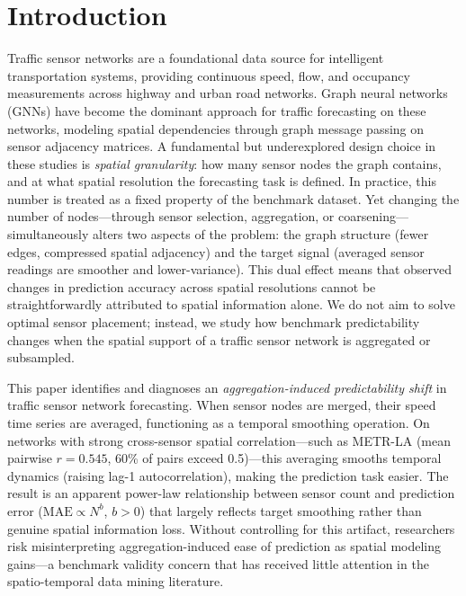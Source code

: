 \documentclass[sigconf]{acmart}
\begin{document}
\section{Introduction}

Traffic sensor networks are a foundational data source for intelligent transportation systems, providing continuous speed, flow, and occupancy measurements across highway and urban road networks. Graph neural networks (GNNs) have become the dominant approach for traffic forecasting on these networks, modeling spatial dependencies through graph message passing on sensor adjacency matrices. A fundamental but underexplored design choice in these studies is \textit{spatial granularity}: how many sensor nodes the graph contains, and at what spatial resolution the forecasting task is defined. In practice, this number is treated as a fixed property of the benchmark dataset. Yet changing the number of nodes---through sensor selection, aggregation, or coarsening---simultaneously alters two aspects of the problem: the graph structure (fewer edges, compressed spatial adjacency) and the target signal (averaged sensor readings are smoother and lower-variance). This dual effect means that observed changes in prediction accuracy across spatial resolutions cannot be straightforwardly attributed to spatial information alone. We do not aim to solve optimal sensor placement; instead, we study how benchmark predictability changes when the spatial support of a traffic sensor network is aggregated or subsampled.

This paper identifies and diagnoses an \textit{aggregation-induced predictability shift} in traffic sensor network forecasting. When sensor nodes are merged, their speed time series are averaged, functioning as a temporal smoothing operation. On networks with strong cross-sensor spatial correlation---such as METR-LA (mean pairwise $r = 0.545$, 60\% of pairs exceed 0.5)---this averaging smooths temporal dynamics (raising lag-1 autocorrelation), making the prediction task easier. The result is an apparent power-law relationship between sensor count and prediction error ($\text{MAE} \propto N^b$, $b > 0$) that largely reflects target smoothing rather than genuine spatial information loss. Without controlling for this artifact, researchers risk misinterpreting aggregation-induced ease of prediction as spatial modeling gains---a benchmark validity concern that has received little attention in the spatio-temporal data mining literature.
\end{document}
